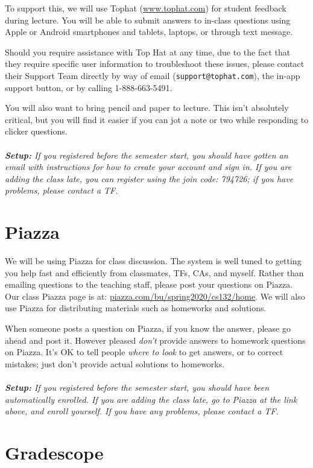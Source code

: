 \documentclass[11pt]{article}
\begin{document}
To support this, we will use Tophat (\url{www.tophat.com}) for student
feedback during lecture. You will be able to submit answers to in-class
questions using Apple or Android smartphones and tablets, laptops, or
through text message. 

Should you require assistance with Top Hat at any time, due to the fact
that they require specific user information to troubleshoot these
issues, please contact their Support Team directly by way of email
(\texttt{support@tophat.com}), the in-app support button, or by calling
1-888-663-5491. 

You will also want to bring pencil and paper to lecture.   This isn't
absolutely critical, but you will find it easier if you can jot a note
or two while responding to clicker questions.
\\
~\\\emph{\textbf{Setup:} If you registered before the semester start,
  you should have gotten an email with instructions for how to create
  your account and sign in.  If you are adding the
  class late, you can register using the join code: 794726; if you have
  problems, please contact a TF.} 

\section*{Piazza}

We will be using Piazza for class discussion. The system is well
tuned to getting you help fast and efficiently from classmates, TFs,
CAs,
and myself. Rather than emailing questions to the teaching staff,
please post your questions on Piazza.   Our class Piazza
page  is at: \url{piazza.com/bu/spring2020/cs132/home}. 
We will also use Piazza for distributing materials
such as homeworks and solutions.

When someone posts a question on Piazza, if you know the answer, please
go ahead and post it.   However pleased \emph{don't} provide answers to homework
questions on Piazza.   It's OK to tell people \emph{where to look} to
get answers, or to correct mistakes;  just don't provide actual solutions
to homeworks.
\\
~\\\emph{\textbf{Setup:} If you registered before the semester start,
  you should have been automatically enrolled.  If you are adding the
  class late, go to Piazza at the link above, and enroll yourself.   If you have any
  problems, please contact a TF.}

\section*{Gradescope}
\end{document}
